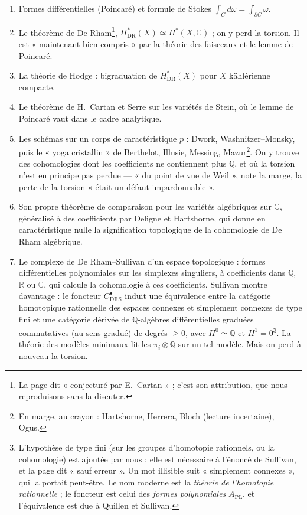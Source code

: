 \documentclass[11pt,a4paper]{article}
\begin{document}
\begin{enumerate}
\item[a)] Formes différentielles (Poincaré) et formule de Stokes
$\int_C d\omega = \int_{\partial C} \omega$.
\item[b)] Le théorème de De Rham\footnote{La page dit « conjecturé par
E.~Cartan » ; c'est son attribution, que nous reproduisons sans la
discuter.}, $H^*_{\mathrm{DR}}(X) \simeq H^*(X, \mathbb{C})$ ; on y perd la
torsion. Il est « maintenant bien compris » par la théorie des faisceaux et le
lemme de Poincaré.
\item[c)] La théorie de Hodge : bigraduation de $H^*_{\mathrm{DR}}(X)$ pour $X$
kählérienne compacte.
\item[d)] Le théorème de H.~Cartan et Serre sur les variétés de Stein, où le
lemme de Poincaré vaut dans le cadre analytique.
\item[e)] Les schémas sur un corps de caractéristique $p$ : Dwork,
Washnitzer–Monsky, puis le « yoga cristallin » de Berthelot, Illusie, Messing,
Mazur\footnote{En marge, au crayon : Hartshorne, Herrera, Bloch (lecture
incertaine), Ogus.}. On y trouve des cohomologies dont les coefficients ne
contiennent plus $\mathbb{Q}$, et où la torsion n'est en principe pas perdue —
« du point de vue de Weil », note la marge, la perte de la torsion « était un
défaut impardonnable ».
\item[f)] Son propre théorème de comparaison pour les variétés algébriques sur
$\mathbb{C}$, généralisé à des coefficients par Deligne et Hartshorne, qui donne
en caractéristique nulle la signification topologique de la cohomologie de De
Rham algébrique.
\item[g)] Le complexe de De Rham–Sullivan d'un espace topologique : formes
différentielles polynomiales sur les simplexes singuliers, à coefficients dans
$\mathbb{Q}$, $\mathbb{R}$ ou $\mathbb{C}$, qui calcule la cohomologie à ces
coefficients. Sullivan montre davantage : le foncteur $C^\bullet_{\mathrm{DRS}}$
induit une équivalence entre la catégorie homotopique rationnelle des espaces
connexes et simplement connexes de type fini et une catégorie dérivée de
$\mathbb{Q}$-algèbres différentielles graduées commutatives (au sens gradué) de
degrés $\geq 0$, avec $H^0 \simeq \mathbb{Q}$ et $H^1 = 0$\footnote{L'hypothèse
de type fini (sur les groupes d'homotopie rationnels, ou la cohomologie) est
ajoutée par nous ; elle est nécessaire à l'énoncé de Sullivan, et la page dit
« sauf erreur ». Un mot illisible suit « simplement connexes », qui la portait
peut-être. Le nom moderne est la \emph{théorie de l'homotopie rationnelle} ; le
foncteur est celui des \emph{formes polynomiales} $A_{\mathrm{PL}}$, et
l'équivalence est due à Quillen et Sullivan.}. La théorie des modèles minimaux
lit les $\pi_i \otimes \mathbb{Q}$ sur un tel modèle. Mais on perd à nouveau la
torsion.
\end{enumerate}
\end{document}
